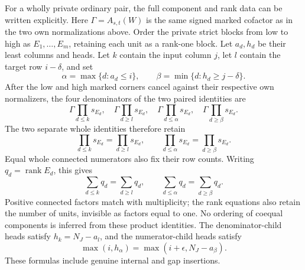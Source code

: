 \documentclass[11pt,a4paper]{amsart}
\numberwithin{equation}{section}
\theoremstyle{plain}
\theoremstyle{definition}
\begin{document}
For a wholly private ordinary pair, the full component and rank data
can be written explicitly.  Here \(\Gamma=A_{s,t}(W)\) is the same
signed marked cofactor as in the two own normalizations above.  Order the private strict blocks from low to
high as \(E_1,\ldots,E_m\), retaining each unit as a rank-one block.
Let \(a_d,h_d\) be their least columns and heads.  Let \(k\) contain
the input column \(j\), let \(l\) contain the target row
\(i-\delta\), and set
\[
 \alpha=\max\{d:a_d\le i\},\qquad
 \beta=\min\{d:h_d\ge j-\delta\}.
\]
After the low and high marked corners cancel against their respective
own normalizers, the four denominators of the two paired identities are
\[
 \Gamma\prod_{d\le k}s_{E_d},\quad
 \Gamma\prod_{d\ge l}s_{E_d},\quad
 \Gamma\prod_{d\le\alpha}s_{E_d},\quad
 \Gamma\prod_{d\ge\beta}s_{E_d}.
\]
The two separate whole identities therefore retain
\begin{equation}\label{ph:private-products}
 \prod_{d\le k}s_{E_d}=\prod_{d\ge l}s_{E_d},\qquad
 \prod_{d\le\alpha}s_{E_d}=\prod_{d\ge\beta}s_{E_d}.
\end{equation}
Equal whole connected numerators also fix their row counts.  Writing
\(q_d=\operatorname{rank}E_d\), this gives
\[
 \sum_{d\le k}q_d=\sum_{d\ge l}q_d,\qquad
 \sum_{d\le\alpha}q_d=\sum_{d\ge\beta}q_d.
\]
Positive connected factors match with multiplicity; the rank equations
also retain the number of units, invisible as factors equal to one.
No ordering of coequal components is inferred from these product identities.
The denominator-child heads satisfy \(h_k=N_J-a_l\), and the
numerator-child heads satisfy
\[
 \max(i,h_\alpha)=\max(i+\epsilon,N_J-a_\beta).
\]
These formulas include genuine internal and gap insertions.
\end{document}
